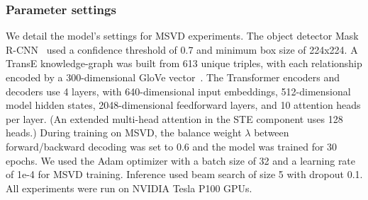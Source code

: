 \subsubsection{Parameter settings}

We detail the model's settings for MSVD experiments. The object detector Mask R-CNN~\cite{he2017mask} used a confidence threshold of 0.7 and minimum box size of 224x224. A TransE knowledge-graph was built from 613 unique triples, with each relationship encoded by a 300-dimensional GloVe vector~\cite{pennington-etal-2014-glove}. The Transformer encoders and decoders use 4 layers, with 640-dimensional input embeddings, 512-dimensional model hidden states, 2048-dimensional feedforward layers, and 10 attention heads per layer. (An extended multi-head attention in the STE component uses 128 heads.) During training on MSVD, the balance weight $\lambda$ between forward/backward decoding was set to 0.6 and the model was trained for 30 epochs. We used the Adam optimizer with a batch size of 32 and a learning rate of 1e-4 for MSVD training. Inference used beam search of size 5 with dropout 0.1. All experiments were run on NVIDIA Tesla P100 GPUs.
